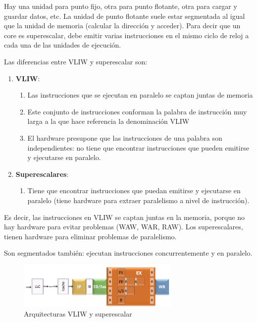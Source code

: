 \documentclass[10pt,a4paper,spanish]{report}
\begin{document}
Hay una unidad para punto fijo, otra para punto flotante, otra para cargar y guardar datos, etc. La unidad de punto flotante suele estar segmentada al igual que la unidad de memoria (calcular la dirección y acceder). Para decir que un core es superescalar, debe emitir varias instrucciones en el mismo ciclo de reloj a cada una de las unidades de ejecución. 

Las diferencias entre VLIW y superescalar son:
\begin{enumerate}[\color{azul}{\bf $\heartsuit$}]
    \item \textbf{\textcolor[rgb]{0.2,0.4,0.8}{VLIW}}:
    \begin{enumerate}[$\longrightarrow$]
        \item Las instrucciones que se ejecutan en paralelo se captan juntas de memoria
        \item Este conjunto de instrucciones conforman la palabra de instrucción muy larga a la que hace referencia la denominación VLIW
        \item El hardware presupone que las instrucciones de una palabra son independientes: no tiene que encontrar instrucciones que pueden emitirse y ejecutarse en paralelo.
    \end{enumerate}
    \item \textbf{\textcolor[rgb]{0.2,0.4,0.8}{Superescalares}}:
    \begin{enumerate}[$\longrightarrow$]
        \item Tiene que encontrar instrucciones que puedan emitirse y ejecutarse en paralelo (tiene hardware para extraer paralelismo a nivel de instrucción).
    \end{enumerate}
\end{enumerate}

Es decir, las instrucciones en VLIW se captan juntas en la memoria, porque no hay hardware para evitar problemas (WAW, WAR, RAW). Los superescalares, tienen hardware para eliminar problemas de paralelismo.

Son segmentados también: ejecutan instrucciones concurrentemente y en paralelo. 

\begin{figure}[!h]
\centering
\includegraphics[width=0.7\textwidth]{60}
\caption{Arquitecturas VLIW y superescalar}
\label{arq_vs}
\end{figure}
\end{document}
